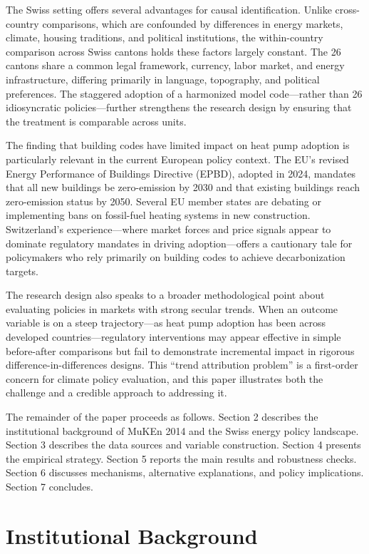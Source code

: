\documentclass[12pt]{article}
\begin{document}
The Swiss setting offers several advantages for causal identification. Unlike cross-country comparisons, which are confounded by differences in energy markets, climate, housing traditions, and political institutions, the within-country comparison across Swiss cantons holds these factors largely constant. The 26 cantons share a common legal framework, currency, labor market, and energy infrastructure, differing primarily in language, topography, and political preferences. The staggered adoption of a harmonized model code---rather than 26 idiosyncratic policies---further strengthens the research design by ensuring that the treatment is comparable across units.

The finding that building codes have limited impact on heat pump adoption is particularly relevant in the current European policy context. The EU's revised Energy Performance of Buildings Directive (EPBD), adopted in 2024, mandates that all new buildings be zero-emission by 2030 and that existing buildings reach zero-emission status by 2050. Several EU member states are debating or implementing bans on fossil-fuel heating systems in new construction. Switzerland's experience---where market forces and price signals appear to dominate regulatory mandates in driving adoption---offers a cautionary tale for policymakers who rely primarily on building codes to achieve decarbonization targets.

The research design also speaks to a broader methodological point about evaluating policies in markets with strong secular trends. When an outcome variable is on a steep trajectory---as heat pump adoption has been across developed countries---regulatory interventions may appear effective in simple before-after comparisons but fail to demonstrate incremental impact in rigorous difference-in-differences designs. This ``trend attribution problem'' is a first-order concern for climate policy evaluation, and this paper illustrates both the challenge and a credible approach to addressing it.

The remainder of the paper proceeds as follows. Section 2 describes the institutional background of MuKEn 2014 and the Swiss energy policy landscape. Section 3 describes the data sources and variable construction. Section 4 presents the empirical strategy. Section 5 reports the main results and robustness checks. Section 6 discusses mechanisms, alternative explanations, and policy implications. Section 7 concludes.


\section{Institutional Background}
\end{document}

